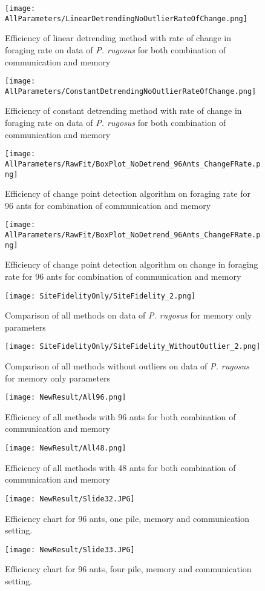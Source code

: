 \begin{figure}
	\texttt{[image: AllParameters/LinearDetrendingNoOutlierRateOfChange.png]}
	\caption{Efficiency of linear detrending method with rate of change in foraging rate on data of \textit{P. rugosus} for both combination of communication and memory}
\end{figure}
\begin{figure}
	\texttt{[image: AllParameters/ConstantDetrendingNoOutlierRateOfChange.png]}
	\caption{Efficiency of constant detrending method with rate of change in foraging rate on data of \textit{P. rugosus} for both combination of communication and memory}
\end{figure}
\begin{figure}
	\texttt{[image: AllParameters/RawFit/BoxPlot\_NoDetrend\_96Ants\_ChangeFRate.png]}
	\caption{Efficiency of change point detection algorithm on foraging rate for 96 ants for combination of communication and memory}
\end{figure}
\begin{figure}
	\texttt{[image: AllParameters/RawFit/BoxPlot\_NoDetrend\_96Ants\_ChangeFRate.png]}
	\caption{Efficiency of change point detection algorithm on change in foraging rate for 96 ants for combination of communication and memory}
\end{figure}
\begin{figure}
	\texttt{[image: SiteFidelityOnly/SiteFidelity\_2.png]}
	\caption{Comparison of all methods on data of \textit{P. rugosus} for memory only parameters}
\end{figure}
\begin{figure}
	\texttt{[image: SiteFidelityOnly/SiteFidelity\_WithoutOutlier\_2.png]}
	\caption{Comparison of all methods without outliers on data of \textit{P. rugosus} for memory only parameters}
\end{figure}
\begin{figure}
	\texttt{[image: NewResult/All96.png]}
	\caption{Efficiency of all methods with 96 ants for both combination of communication and memory}
\end{figure}
\begin{figure}
	\texttt{[image: NewResult/All48.png]}
	\caption{Efficiency of all methods with 48 ants for both combination of communication and memory}
\end{figure}
\clearpage
\begin{figure}[h]
	\texttt{[image: NewResult/Slide32.JPG]}
	\caption{Efficiency chart for 96 ants, one pile,  memory and communication setting.}
\end{figure}
\begin{figure}[h]
	\texttt{[image: NewResult/Slide33.JPG]}
	\caption{Efficiency chart for 96 ants, four pile,  memory and communication setting.}
\end{figure}

